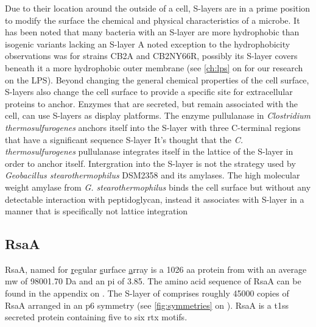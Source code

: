 Due to their location around the outside of a cell, \acp{S-layer} are in a prime position to modify the surface the chemical and physical characteristics of a microbe. It has been noted that many bacteria with an \ac{S-layer} are more hydrophobic than isogenic variants lacking an \ac{S-layer} A noted exception to the hydrophobicity observations was for \caulobacter strains CB2A and CB2NY66R, possibly its \ac{S-layer} covers beneath it a more hydrophobic outer membrane (see \cref{ch:lps} on  for our research on the \caulobacter \ac{LPS}). Beyond changing the general chemical properties of the cell surface, \acp{S-layer} also change the cell surface to provide a specific site for extracellular proteins to anchor. Enzymes that are secreted, but remain associated with the cell, can use \acp{S-layer} as display platforms. The enzyme pullulanase in \textit{Clostridium thermosulfurogenes} anchors itself into the \ac{S-layer} with three C-terminal regions that have a significant sequence \ac{S-layer} It's thought that the \textit{C. thermosulfurogenes} pullulanase integrates itself in the lattice of the \ac{S-layer} in order to anchor itself. Intergration into the \ac{S-layer} is not the strategy used by \textit{Geobacillus stearothermophilus} DSM2358 and its amylases. The high molecular weight amylase from \textit{G. stearothermophilus} binds the cell surface but without any detectable interaction with peptidoglycan, instead it associates with \ac{S-layer} in a manner that is specifically not lattice integration


\subsection{RsaA} \label{sec:intro-rsaa}

RsaA, named for \underline{r}egular \underline{s}urface \underline{a}rray is a 1026 \ac{aa} protein from \caulobacter with an average \ac{mw} of 98001.70 Da and an \ac{pi} of 3.85. The amino acid sequence of RsaA can be found in the appendix on . The \ac{S-layer} of \caulobacter comprises roughly 45000 copies of RsaA arranged in an p6 symmetry (see \cref{fig:symmetries} on ). RsaA is a \ac{t1ss} secreted protein containing five to six \ac{rtx} motifs.

